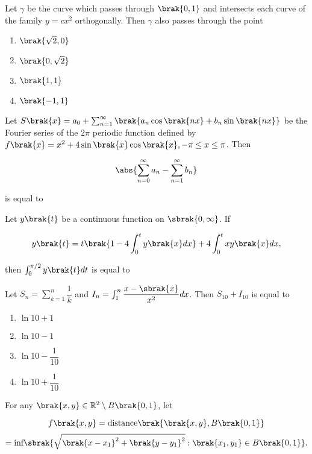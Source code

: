 \item Let $\gamma$ be the curve which passes through $\brak{0,1}$ and intersects each curve of the family $y = c x^2$ orthogonally. Then $\gamma$ also passes through the point

    \begin{enumerate}
        \item $\brak{\sqrt{2},0}$
        \item $\brak{0,\sqrt{2}}$
        \item $\brak{1,1}$
        \item $\brak{-1,1}$
    \end{enumerate}

\item Let $S\brak{x} = a_0 + \sum_{n=1}^{\infty}\brak{a_n \cos\brak{n x} + b_n \sin\brak{n x}}$ be the Fourier series of the $2 \pi$ periodic function defined by $f\brak{x} = x^2 + 4 \sin\brak{x} \cos\brak{x}, -\pi \le x \le \pi$. Then 

    $$\abs{\sum_{n=0}^{\infty} a_n - \sum_{n=1}^{\infty} b_n}$$

    is equal to \underline{\hspace{2cm}}

\item Let $y\brak{t}$ be a continuous function on $\sbrak{0,\infty}$. If

    $$y\brak{t} = t\brak{1 - 4\int_{0}^{t}y\brak{x}dx} + 4\int_{0}^{t}x y\brak{x}dx,$$

    then $\int_{0}^{\pi/2} y\brak{t} dt$ is equal to \underline{\hspace{2cm}}

\item Let $S_n = \sum_{k=1}^{n} \dfrac{1}{k}$ and $I_n = \int_{1}^{n} \dfrac{x - \sbrak{x}}{x^2} dx$. Then $S_{10} + I_{10}$ is equal to

    \begin{enumerate}
        \item $\ln 10 + 1$
        \item $\ln 10 - 1$
        \item $\ln 10 - \dfrac{1}{10}$
        \item $\ln 10 + \dfrac{1}{10}$
    \end{enumerate}

\item For any $\brak{x,y} \in \mathbb{R}^2 \setminus B\brak{0,1}$, let

    $$f\brak{x,y} = \text{distance}\brak{\brak{x,y}, B\brak{0,1}}$$
    $$= \text{inf}\sbrak{\sqrt{\brak{x - x_1}^2 + \brak{y - y_1}^2} : \brak{x_1,y_1} \in B\brak{0,1}}.$$

